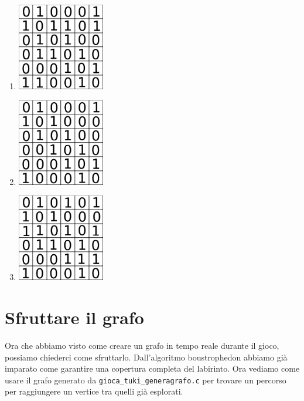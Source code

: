 \documentclass[8pt]{book}
\begin{document}
\begin{enumerate}
\begin{enumerate}
\item
  \includegraphics[width=0.30000\textwidth]{img/matriceGrafo_es_sol1.png}
\item
  \includegraphics[width=0.30000\textwidth]{img/matriceGrafo_es_sol2.png}
\item
  \includegraphics[width=0.30000\textwidth]{img/matriceGrafo_es_sol3.png}
\end{enumerate}

\end{enumerate}


\chapter{Sfruttare il grafo}

Ora che abbiamo visto come creare un grafo in tempo reale durante il gioco, possiamo chiederci come sfruttarlo. Dall'algoritmo boustrophedon abbiamo già imparato come garantire una copertura completa del labirinto. Ora vediamo come usare il grafo generato da \texttt{gioca\_tuki\_generagrafo.c} per trovare un percorso per raggiungere un vertice tra quelli già esplorati.\\
\end{document}
